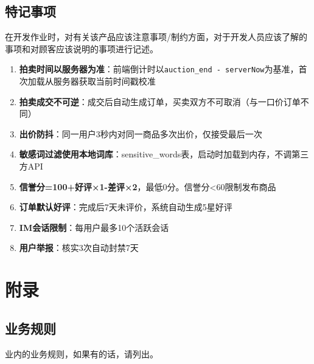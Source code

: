 \documentclass[12pt,a4paper]{ctexart}
\numberwithin{figure}{section}
\numberwithin{table}{section}
\begin{document}
\subsection{特记事项}

在开发作业时，对有关该产品应该注意事项/制约方面，对于开发人员应该了解的事项和对顾客应该说明的事项进行记述。

\begin{enumerate}
    \item \textbf{拍卖时间以服务器为准}：前端倒计时以\verb|auction_end - serverNow|为基准，首次加载从服务器获取当前时间戳校准
    \item \textbf{拍卖成交不可逆}：成交后自动生成订单，买卖双方不可取消（与一口价订单不同）
    \item \textbf{出价防抖}：同一用户3秒内对同一商品多次出价，仅接受最后一次
    \item \textbf{敏感词过滤使用本地词库}：sensitive\_words表，启动时加载到内存，不调第三方API
    \item \textbf{信誉分=100+好评×1-差评×2}，最低0分。信誉分<60限制发布商品
    \item \textbf{订单默认好评}：完成后7天未评价，系统自动生成5星好评
    \item \textbf{IM会话限制}：每用户最多10个活跃会话
    \item \textbf{用户举报}：核实3次自动封禁7天
\end{enumerate}

\section{附录}

\subsection{业务规则}

业内的业务规则，如果有的话，请列出。
\end{document}
